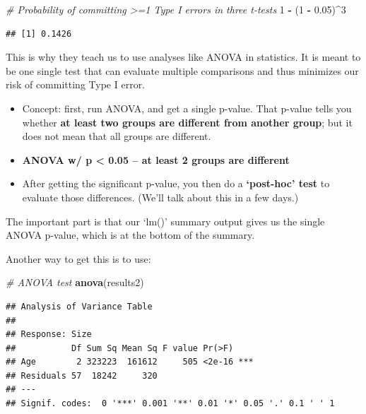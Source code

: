 \documentclass[
]{article}
\newenvironment{Shaded}{\begin{snugshade}}{\end{snugshade}}
\newcommand{\CommentTok}[1]{\textcolor[rgb]{0.56,0.35,0.01}{\textit{#1}}}
\newcommand{\DecValTok}[1]{\textcolor[rgb]{0.00,0.00,0.81}{#1}}
\newcommand{\FloatTok}[1]{\textcolor[rgb]{0.00,0.00,0.81}{#1}}
\newcommand{\FunctionTok}[1]{\textcolor[rgb]{0.13,0.29,0.53}{\textbf{#1}}}
\newcommand{\NormalTok}[1]{#1}
\newcommand{\SpecialCharTok}[1]{\textcolor[rgb]{0.81,0.36,0.00}{\textbf{#1}}}
\begin{document}
\begin{Shaded}
\begin{Highlighting}[]
\CommentTok{\# Probability of committing \textgreater{}=1 Type I errors in three t{-}tests}
\DecValTok{1} \SpecialCharTok{{-}}\NormalTok{ (}\DecValTok{1} \SpecialCharTok{{-}} \FloatTok{0.05}\NormalTok{)}\SpecialCharTok{\^{}}\DecValTok{3}
\end{Highlighting}
\end{Shaded}

\begin{verbatim}
## [1] 0.1426
\end{verbatim}

This is why they teach us to use analyses like ANOVA in statistics. It
is meant to be one single test that can evaluate multiple comparisons
and thus minimizes our risk of committing Type I error.

\begin{itemize}
\item
  Concept: first, run ANOVA, and get a single p-value. That p-value
  tells you whether \textbf{at least two groups are different from
  another group}; but it does not mean that all groups are different.
\item
  \textbf{ANOVA w/ p \textless{} 0.05 -- at least 2 groups are
  different}
\item
  After getting the significant p-value, you then do a
  \textbf{`post-hoc' test} to evaluate those differences. (We'll talk
  about this in a few days.)
\end{itemize}

The important part is that our `lm()' summary output gives us the single
ANOVA p-value, which is at the bottom of the summary.

Another way to get this is to use:

\begin{Shaded}
\begin{Highlighting}[]
\CommentTok{\# ANOVA test}
\FunctionTok{anova}\NormalTok{(results2)}
\end{Highlighting}
\end{Shaded}

\begin{verbatim}
## Analysis of Variance Table
## 
## Response: Size
##           Df Sum Sq Mean Sq F value Pr(>F)    
## Age        2 323223  161612     505 <2e-16 ***
## Residuals 57  18242     320                   
## ---
## Signif. codes:  0 '***' 0.001 '**' 0.01 '*' 0.05 '.' 0.1 ' ' 1
\end{verbatim}
\end{document}
